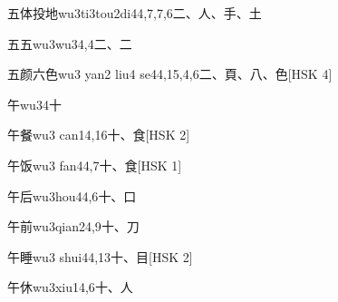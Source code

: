 \begin{EntryWithPhonetic}{五体投地}{wu3ti3tou2di4}{4,7,7,6}{⼆、⼈、⼿、⼟}
\end{EntryWithPhonetic}

\begin{EntryWithPhonetic}{五五}{wu3wu3}{4,4}{⼆、⼆}
\end{EntryWithPhonetic}

\begin{EntryWithPhonetic}{五颜六色}{wu3 yan2 liu4 se4}{4,15,4,6}{⼆、⾴、⼋、⾊}[HSK 4]
\end{EntryWithPhonetic}

\begin{EntryWithPhonetic}{午}{wu3}{4}{⼗}
\end{EntryWithPhonetic}

\begin{EntryWithPhonetic}{午餐}{wu3 can1}{4,16}{⼗、⾷}[HSK 2]
\end{EntryWithPhonetic}

\begin{EntryWithPhonetic}{午饭}{wu3 fan4}{4,7}{⼗、⾷}[HSK 1]
\end{EntryWithPhonetic}

\begin{EntryWithPhonetic}{午后}{wu3hou4}{4,6}{⼗、⼝}
\end{EntryWithPhonetic}

\begin{EntryWithPhonetic}{午前}{wu3qian2}{4,9}{⼗、⼑}
\end{EntryWithPhonetic}

\begin{EntryWithPhonetic}{午睡}{wu3 shui4}{4,13}{⼗、⽬}[HSK 2]
\end{EntryWithPhonetic}

\begin{EntryWithPhonetic}{午休}{wu3xiu1}{4,6}{⼗、⼈}
\end{EntryWithPhonetic}

